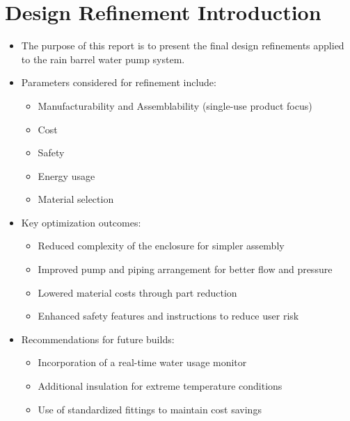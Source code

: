 \documentclass[12pt]{article}
\begin{document}
\section{Design Refinement Introduction}
\begin{itemize}[leftmargin=1.5cm]
    \item The purpose of this report is to present the final design refinements applied to the rain barrel water pump system.
    \item Parameters considered for refinement include:
    \begin{itemize}
        \item Manufacturability and Assemblability (single-use product focus)
        \item Cost
        \item Safety
        \item Energy usage
        \item Material selection
    \end{itemize}
    \item Key optimization outcomes:
    \begin{itemize}
        \item Reduced complexity of the enclosure for simpler assembly
        \item Improved pump and piping arrangement for better flow and pressure
        \item Lowered material costs through part reduction
        \item Enhanced safety features and instructions to reduce user risk
    \end{itemize}
    \item Recommendations for future builds:
    \begin{itemize}
        \item Incorporation of a real-time water usage monitor
        \item Additional insulation for extreme temperature conditions
        \item Use of standardized fittings to maintain cost savings
    \end{itemize}
\end{itemize}


\end{document}

